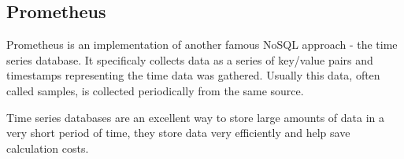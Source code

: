 \subsection{Prometheus}
\label{subsec:background:second_section:thrid_subsection}
\par Prometheus is an implementation of another famous NoSQL approach - the time series database. It specificaly collects data as a series of key/value pairs and timestamps representing the time data was gathered. Usually this data, often called samples, is collected periodically from the same source. 
\par Time series databases are an excellent way to store large amounts of data in a very short period of time, they store data very efficiently and help save calculation costs.

